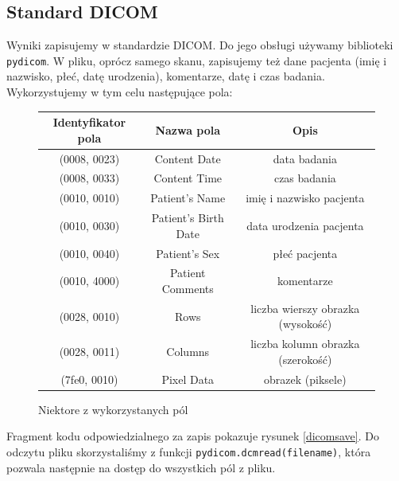 \documentclass[polish,polish,a4paper]{article}
\begin{document}
			\subsection{Standard DICOM}
			Wyniki zapisujemy w standardzie DICOM. 
			Do jego obsługi używamy biblioteki \texttt{pydicom}.
			W pliku, oprócz samego skanu, zapisujemy też dane pacjenta (imię i nazwisko, płeć, datę urodzenia), komentarze, datę i czas badania.
			Wykorzystujemy w tym celu następujące pola:
			\begin{figure}[!h]
				\centering
				\begin{tabular}{|c|c|c|}
				\hline
				\textbf{Identyfikator pola} & \textbf{Nazwa pola} & \textbf{Opis} \\
				\hline \hline
				(0008, 0023) & Content Date & data badania \\
				\hline
				(0008, 0033) & Content Time & czas badania \\
				\hline
				(0010, 0010) & Patient's Name & imię i nazwisko pacjenta \\
				\hline
				(0010, 0030) & Patient's Birth Date & data urodzenia pacjenta \\
				\hline
				(0010, 0040) & Patient's Sex & płeć pacjenta \\
				\hline
				(0010, 4000) & Patient Comments & komentarze \\
				\hline
				(0028, 0010) & Rows & liczba wierszy obrazka (wysokość) \\
				\hline
				(0028, 0011) & Columns & liczba kolumn obrazka (szerokość) \\
				\hline
				(7fe0, 0010) & Pixel Data & obrazek (piksele) \\
				\hline
				\end{tabular}
				\caption{Niektore z wykorzystanych pól}
			\end{figure}
			\newpage
			Fragment kodu odpowiedzialnego za zapis pokazuje rysunek \ref{dicomsave}. Do odczytu pliku skorzystaliśmy z funkcji \texttt{pydicom.dcmread(filename)}, która pozwala następnie na dostęp do wszystkich pól z pliku.
			
\end{document}
